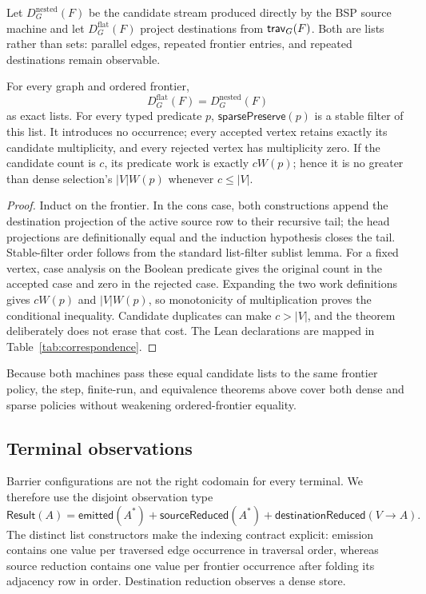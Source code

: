 Let $D_G^{\mathrm{nested}}(F)$ be the candidate stream produced directly by
the BSP source machine and let $D_G^{\mathrm{flat}}(F)$ project destinations
from $\mathsf{trav}_G(F)$.  Both are lists rather than sets: parallel edges, repeated
frontier entries, and repeated destinations remain observable.

\begin{theorem}
\label{thm:sparse-frontier}
For every graph and ordered frontier,
\[
 D_G^{\mathrm{flat}}(F)=D_G^{\mathrm{nested}}(F)
\]
as exact lists.  For every typed predicate $p$,
$\mathsf{sparsePreserve}(p)$ is a stable filter of this list.  It introduces no
occurrence; every accepted vertex retains exactly its candidate multiplicity,
and every rejected vertex has multiplicity zero.  If the candidate count is
$c$, its predicate work is exactly $cW(p)$; hence it is no greater than dense
selection's $|V|W(p)$ whenever $c\leq |V|$.
\end{theorem}

\begin{proof}
Induct on the frontier.  In the cons case, both constructions append the
destination projection of the active source row to their recursive tail; the
head projections are definitionally equal and the induction hypothesis closes
the tail.  Stable-filter order follows from the standard list-filter sublist
lemma.  For a fixed vertex, case analysis on the Boolean predicate gives the
original count in the accepted case and zero in the rejected case.  Expanding
the two work definitions gives $cW(p)$ and $|V|W(p)$, so monotonicity of
multiplication proves the conditional inequality.  Candidate duplicates can
make $c>|V|$, and the theorem deliberately does not erase that cost.  The Lean
declarations are mapped in Table~\ref{tab:correspondence}.
\end{proof}

Because both machines pass these equal candidate lists to the same frontier
policy, the step, finite-run, and equivalence theorems above cover both dense
and sparse policies without weakening ordered-frontier equality.

\subsection{Terminal observations}
\label{sec:terminal-observations}

Barrier configurations are not the right codomain for every terminal.  We
therefore use the disjoint observation type
\[
 \mathsf{Result}(A)=
   \mathsf{emitted}(A^*)
   +\mathsf{sourceReduced}(A^*)
   +\mathsf{destinationReduced}(V\to A).
\]
The distinct list constructors make the indexing contract explicit: emission
contains one value per traversed edge occurrence in traversal order, whereas
source reduction contains one value per frontier occurrence after folding its
adjacency row in order.  Destination reduction observes a dense store.

